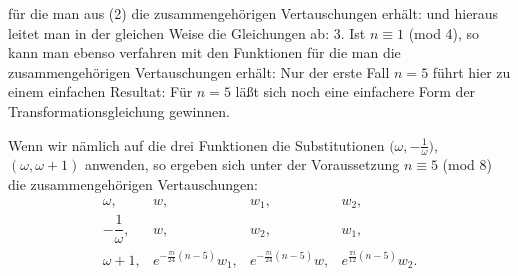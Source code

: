 f\"ur die man aus (2) die zusammengeh\"origen Vertauschungen erh\"alt:
und hieraus leitet man in der gleichen Weise die Gleichungen ab:
3. Ist $n \equiv 1$ (mod 4), so kann man ebenso verfahren mit den Funktionen
f\"ur die man die zusammengeh\"origen Vertauschungen erh\"alt:
Nur der erste Fall $n=5$ f\"uhrt hier zu einem einfachen Resultat:
F\"ur $n=5$ l\"a\ss{}t sich noch eine einfachere Form der Transformationsgleichung gewinnen.

Wenn wir n\"amlich auf die drei Funktionen
die Substitutionen $\bigl(\omega, -\frac{1}{\omega}\bigr)$, $(\omega, \omega+1)$ anwenden, so ergeben sich unter der Voraussetzung $n \equiv 5$ (mod 8) die zusammengeh\"origen Vertauschungen:
\[
\begin{array}{llll}
\omega, & w, & w_1, & w_2,\\
-\dfrac{1}{\omega}, & w, & w_2, & w_1,\\
\omega+1, & e^{-\frac{\pi i}{24}(n-5)}w_1, & e^{-\frac{\pi i}{24}(n-5)}w, & e^{\frac{\pi i}{12}(n-5)}w_2.
\end{array}
\]
